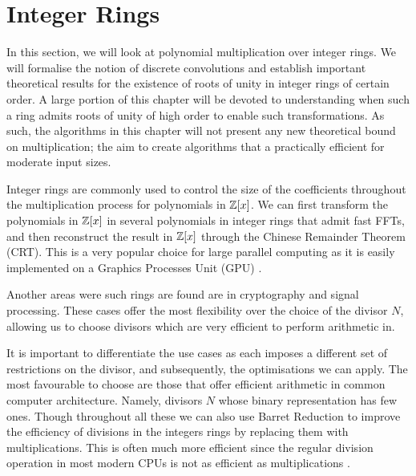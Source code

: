 \chapter{Integer Rings}\label{chp:integer-rings}


In this section, we will look at polynomial multiplication over integer rings. We will formalise the notion of discrete convolutions and establish important theoretical results for the existence of roots of unity in integer rings of certain order. A large portion of this chapter will be devoted to understanding when such a ring admits roots of unity of high order to enable such transformations. As such, the algorithms in this chapter will not present any new theoretical bound on multiplication; the aim to create algorithms that a practically efficient for moderate input sizes.


Integer rings are commonly used to control the size of the coefficients throughout the multiplication process for polynomials in ${\mathbb Z}[x]$. We can first transform the polynomials in ${\mathbb Z}[x]$ in several polynomials in integer rings that admit fast FFTs, and then reconstruct the result in ${\mathbb Z}[x]$ through the Chinese Remainder Theorem (CRT). This is a very popular choice for large parallel computing as it is easily implemented on a Graphics Processes Unit (GPU) \cite{gpu-mult} \cite{crt-parallel-mul} \cite{gpu-kepler-architecture}.

Another areas were such rings are found are in cryptography and signal processing. These cases offer the most flexibility over the choice of the divisor $N$, allowing us to choose divisors which are very efficient to perform arithmetic in. 

It is important to differentiate the use cases as each imposes a different set of restrictions on the divisor, and subsequently, the optimisations we can apply. The most favourable to choose are those that offer efficient arithmetic in common computer architecture. Namely, divisors $N$ whose binary representation has few ones. Though throughout all these we can also use Barret Reduction \cite{barret} to improve the efficiency of divisions in the integers rings by replacing them with multiplications. This is often much more efficient since the regular division operation in most modern CPUs is not as efficient as multiplications \cite{instruction-times}.

